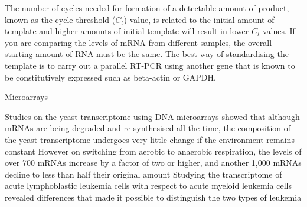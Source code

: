 The number of cycles needed for formation of a detectable amount of product, known as the cycle threshold ($C_{t}$) value, is related to the initial amount of template and higher amounts of initial template will result in lower $C_{t}$ values. If you are comparing the levels of mRNA from different samples, the overall starting amount of RNA must be the same. The best way of standardising the template is to carry out a parallel RT-PCR using another gene that is known to be constitutively expressed such as beta-actin or GAPDH.

Microarrays\cite{pmid7569999}

Studies on the yeast transcriptome using DNA microarrays showed that although mRNAs are being degraded and re-synthesised all the time, the composition of the yeast transcriptome undergoes very little change if the environment remains constant\cite{pmid9381177}
However on switching from aerobic to anaerobic respiration, the levels of over 700 mRNAs increase by a factor of two or higher, and another 1,000 mRNAs decline to less than half their original amount
Studying the transcriptome of acute lymphoblastic leukemia cells with respect to acute myeloid leukemia cells revealed differences that made it possible to distinguish the two types of leukemia

